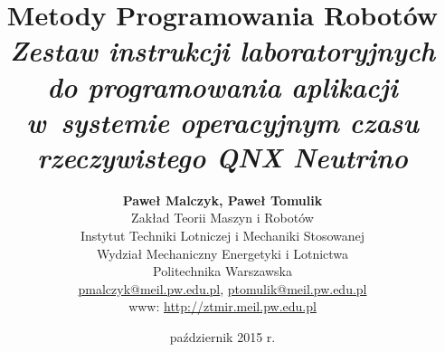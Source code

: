 \documentclass[11pt,twoside,a4paper]{article}
\title{\vspace{4.25cm}\Huge{\textbf{Metody Programowania Robotów}} \\ \vskip10pt\LARGE{\textit{Zestaw instrukcji laboratoryjnych do programowania aplikacji w~systemie operacyjnym czasu rzeczywistego QNX Neutrino}}}
\author{\Large{\textbf{Paweł Malczyk, Paweł Tomulik}}\vspace{0.5cm} \\ Zakład Teorii Maszyn i Robotów \\
Instytut Techniki Lotniczej i Mechaniki Stosowanej \\
Wydział Mechaniczny Energetyki i Lotnictwa \\
Politechnika Warszawska \\
{\href{mailto:pmalczyk@meil.pw.edu.pl}{pmalczyk@meil.pw.edu.pl}}, \href{mailto:ptomulik@meil.pw.edu.pl}{ptomulik@meil.pw.edu.pl} \\ www: \href{http://ztmir.meil.pw.edu.pl}{http://ztmir.meil.pw.edu.pl}}
\date{październik 2015 r.}
\begin{document}
\maketitle
\cleardoublepage












\clearpage

\tableofcontents

\renewcommand{\listtheoremname}{Spis przykładów}
\listoftheorems[ignoreall,show=example]


\cleardoublepage
{}
\listoffigures

\listoftables

\cleardoublepage

\nocite{*}
 \label{pismiennictwo}

\end{document}

